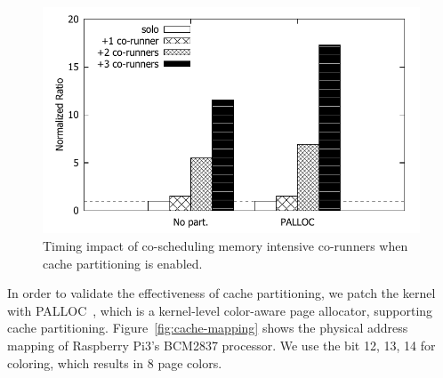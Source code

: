 \begin{figure}[h]
  \centering
  \includegraphics[width=.7\textwidth]{figs/palloc_bandwidth_exectime}
  \caption{Timing impact of co-scheduling memory intensive co-runners 
when cache partitioning is enabled.}
  \label{fig:palloc_bandwidth_exectime}
\end{figure}



In order to validate the effectiveness of cache partitioning, we patch
the kernel with PALLOC~\cite{yun2014rtas}, which is a kernel-level
color-aware page allocator, supporting cache partitioning. 
Figure~\ref{fig:cache-mapping} shows the physical address mapping of
Raspberry Pi3's BCM2837 processor. We use the bit 12, 13, 14 for
coloring, which results in 8 page colors.



